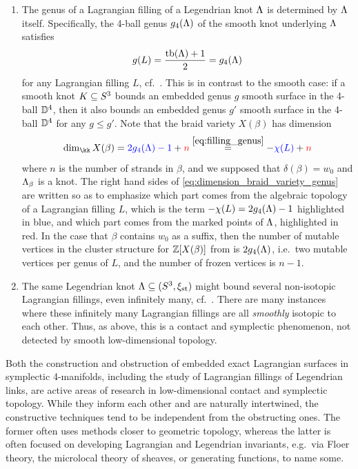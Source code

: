 \begin{enumerate}
    \item The genus of a Lagrangian filling of a Legendrian knot $\Lambda$ is determined by $\Lambda$ itself. Specifically, the 4-ball genus $g_4(\Lambda)$ of the smooth knot underlying $\Lambda$ satisfies
                \begin{equation}\label{eq:filling_genus}
                    g(L)=\frac{\operatorname{tb}(\Lambda)+1}{2}=g_4(\Lambda)
                \end{equation}
    for any Lagrangian filling $L$, cf.~\cite{Chantraine10}. This is in contrast to the smooth case: if a smooth knot $K\subseteq S^3$ bounds an embedded genus $g$ smooth surface in the 4-ball $\mathbb{D}^4$, then it also bounds an embedded genus $g'$ smooth surface in the 4-ball $\mathbb{D}^4$ for any $g\leq g'$. Note that the braid variety $X(\beta)$ has dimension
    \begin{equation}\label{eq:dimension_braid_variety_genus}
        \dim_\kk X(\beta)=\textcolor{blue}{2g_4(\La)-1}+\textcolor{red}{n}\stackrel{\eqref{eq:filling_genus}}{=}-\textcolor{blue}{\chi(L)}+\textcolor{red}{n}
    \end{equation}
    where $n$ is the number of strands in $\beta$, and we supposed that $\delta(\beta)=w_0$ and $\Lambda_\beta$ is a knot. The right hand sides of \eqref{eq:dimension_braid_variety_genus} are written so as to emphasize which part comes from the algebraic topology of a Lagrangian filling $L$, which is the term $-\chi(L)={2g_4(\Lambda)-1}$ highlighted in blue, and which part comes from the marked points of $\Lambda$, highlighted in red. In the case that $\beta$ contains $w_0$ as a suffix, then the number of mutable vertices in the cluster structure for $\mathbb{Z}[X(\beta)]$ from  is $2g_4(\Lambda)$, i.e.~two mutable vertices per genus of $L$, and the number of frozen vertices is $n-1$.\\

    \item The same Legendrian knot $\Lambda\subseteq(S^3,\xi_{\text{st}})$ might bound several non-isotopic Lagrangian fillings, even infinitely many, cf.~\cite{CasalsGao22}. There are many instances where these infinitely many Lagrangian fillings are all {\it smoothly} isotopic to each other. Thus, as above, this is a contact and symplectic phenomenon, not detected by smooth low-dimensional topology.\\
\end{enumerate}

\noindent Both the construction and obstruction of embedded exact Lagrangian surfaces in symplectic 4-manifolds, including the study of Lagrangian fillings of Legendrian links, are active areas of research in low-dimensional contact and symplectic topology. While they inform each other and are naturally intertwined, the constructive techniques tend to be independent from the obstructing ones. The former often uses methods closer to geometric topology, whereas the latter is often focused on developing Lagrangian and Legendrian invariants, e.g.~via Floer theory, the microlocal theory of sheaves, or generating functions, to name some.\\

